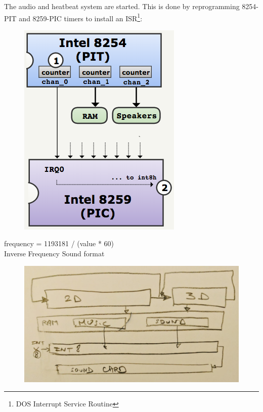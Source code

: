 The audio and heatbeat system are started. This is done by reprogramming 8254-PIT and 8259-PIC timers to install an ISR\footnote{DOS Interrupt Service Routine}:\\
\begin{figure}[H]
\centering
 \includegraphics[width=.5\textwidth]{imgs/heatbeats.png}
 \end{figure}
\par
frequency = 1193181 / (value * 60)\\
Inverse Frequency Sound format\\
\par
\begin{figure}[H]
\centering
 \includegraphics[width=\textwidth]{imgs/three_blocks.png}
 \end{figure}

